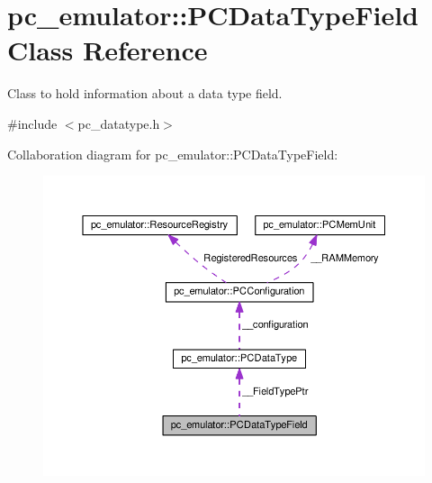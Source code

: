 \hypertarget{classpc__emulator_1_1PCDataTypeField}{}\section{pc\+\_\+emulator\+:\+:P\+C\+Data\+Type\+Field Class Reference}
\label{classpc__emulator_1_1PCDataTypeField}


Class to hold information about a data type field.  




{\ttfamily \#include $<$pc\+\_\+datatype.\+h$>$}



Collaboration diagram for pc\+\_\+emulator\+:\+:P\+C\+Data\+Type\+Field\+:
\nopagebreak
\begin{figure}[H]
\begin{center}
\leavevmode
\includegraphics[width=350pt]{classpc__emulator_1_1PCDataTypeField__coll__graph}
\end{center}
\end{figure}
